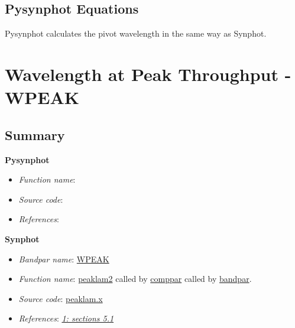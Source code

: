 \documentclass[letterpaper,10pt,english]{sphinxtsr}
\begin{document}
\section{Pysynphot Equations}
\label{main:id22}
Pysynphot calculates the pivot wavelength in the same way as Synphot.


\chapter{Wavelength at Peak Throughput - WPEAK}
\label{main:wavelength-at-peak-throughput-wpeak}

\section{Summary}
\label{main:id23}
\textbf{Pysynphot}
\begin{itemize}
\item {} 
\emph{Function name}:

\item {} 
\emph{Source code}:

\item {} 
\emph{References}:

\end{itemize}

\textbf{Synphot}
\begin{itemize}
\item {} 
\emph{Bandpar name}: \href{https://svn.stsci.edu/trac/ssb/stsci\_python/browser/stsdas/trunk/stsdas/pkg/hst\_calib/synphot/doc/bandpar.hlp}{WPEAK}

\item {} 
\emph{Function name}: \href{https://svn.stsci.edu/trac/ssb/stsci\_python/browser/stsdas/trunk/stsdas/pkg/hst\_calib/synphot/newlib/peaklam.x}{peaklam2}
called by \href{https://svn.stsci.edu/trac/ssb/stsci\_python/browser/stsdas/trunk/stsdas/pkg/hst\_calib/synphot/bandpar/comppar.x}{comppar} called by \href{https://svn.stsci.edu/trac/ssb/stsci\_python/browser/stsdas/trunk/stsdas/pkg/hst\_calib/synphot/bandpar/bandpar.x}{bandpar}.

\item {} 
\emph{Source code}: \href{https://svn.stsci.edu/trac/ssb/stsci\_python/browser/stsdas/trunk/stsdas/pkg/hst\_calib/synphot/newlib/peaklam.x}{peaklam.x}

\item {} 
\emph{References}: {\hyperref[references:ref1]{\emph{1: sections 5.1}}}

\end{itemize}
\end{document}
